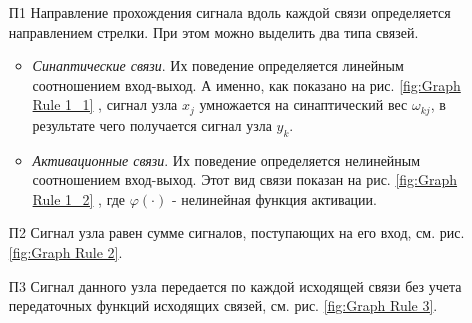 \documentclass[a4paper,12pt]{report}
\begin{document}
\begin{itemize}
    \item[П1] Направление прохождения сигнала вдоль каждой
        связи определяется направлением стрелки. При этом можно
        выделить два типа связей.
    \begin{itemize}
        \item \textit{Синаптические связи}. Их поведение определяется
            линейным соотношением вход-выход. А именно, как показано
            на рис. \ref{fig:Graph Rule 1_1} , сигнал узла $x_j$ умножается на
            синаптический вес $\omega_{kj}$, в результате чего
            получается сигнал узла $y_k$.

        \item \textit{Активационные связи}. Их поведение определяется
            нелинейным соотношением вход-выход. Этот вид связи показан
            на рис. \ref{fig:Graph Rule 1_2} , где $\varphi(\cdot)$ - нелинейная функция
            активации.
    \end{itemize}

    \item[П2] Сигнал узла равен сумме сигналов, поступающих на
        его вход, см. рис. \ref{fig:Graph Rule 2}.

    \item[П3] Сигнал данного узла передается по каждой
        исходящей связи без учета передаточных функций исходящих
        связей, см. рис. \ref{fig:Graph Rule 3}.

\end{itemize}
\end{document}
